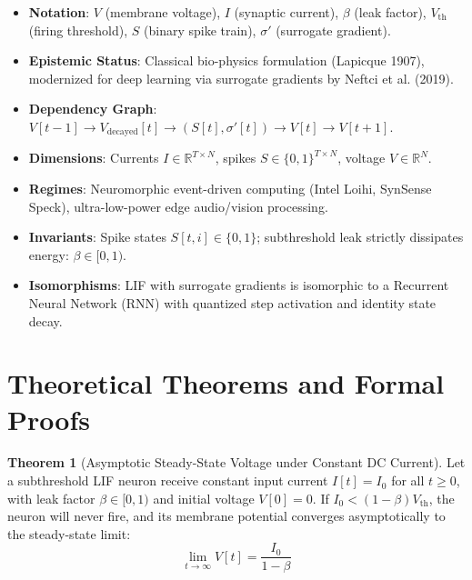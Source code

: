 \documentclass[11pt,a4paper]{article}
\theoremstyle{definition}
\newtheorem{theorem}{\textbf{Theorem}}[section]
\begin{document}
\begin{itemize}
    \item \textbf{Notation}: $V$ (membrane voltage), $I$ (synaptic current), $\beta$ (leak factor), $V_{\text{th}}$ (firing threshold), $S$ (binary spike train), $\sigma'$ (surrogate gradient).
    \item \textbf{Epistemic Status}: Classical bio-physics formulation (Lapicque 1907), modernized for deep learning via surrogate gradients by Neftci et al. (2019).
    \item \textbf{Dependency Graph}: $V[t-1] \to V_{\text{decayed}}[t] \to (S[t], \sigma'[t]) \to V[t] \to V[t+1]$.
    \item \textbf{Dimensions}: Currents $I \in \mathbb{R}^{T \times N}$, spikes $S \in \{0, 1\}^{T \times N}$, voltage $V \in \mathbb{R}^N$.
    \item \textbf{Regimes}: Neuromorphic event-driven computing (Intel Loihi, SynSense Speck), ultra-low-power edge audio/vision processing.
    \item \textbf{Invariants}: Spike states $S[t, i] \in \{0, 1\}$; subthreshold leak strictly dissipates energy: $\beta \in [0, 1)$.
    \item \textbf{Isomorphisms}: LIF with surrogate gradients is isomorphic to a Recurrent Neural Network (RNN) with quantized step activation and identity state decay.
\end{itemize}

\section{Theoretical Theorems and Formal Proofs}

\begin{theorem}[Asymptotic Steady-State Voltage under Constant DC Current]
Let a subthreshold LIF neuron receive constant input current $I[t] = I_0$ for all $t \ge 0$, with leak factor $\beta \in [0, 1)$ and initial voltage $V[0] = 0$. If $I_0 < (1 - \beta) V_{\text{th}}$, the neuron will never fire, and its membrane potential converges asymptotically to the steady-state limit:
{\boldmath
\begin{equation}
\lim_{t \to \infty} V[t] = \frac{I_0}{1 - \beta}
\end{equation}
}
\end{theorem}
\end{document}
